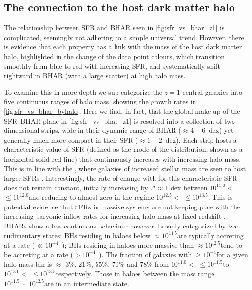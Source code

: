 \subsection{The connection to the host dark matter halo}
\label{sect:to_halo}

The relationship between SFR and BHAR seen in \cref{fig:sfr_vs_bhar_z1} is
complicated, seemingly not adhering to a simple universal trend.  However,
there is evidence that each property has a link with the mass of the host dark
matter halo, highlighted in the change of the data point colours, which
transition smoothly from blue to red with increasing SFR, and systematically
shift rightward in BHAR (with a large scatter) at high halo mass.    

To examine this in more depth we sub categorize the $z=1$ central galaxies into
five continuous ranges of halo mass, showing the growth rates in
\cref{fig:sfr_vs_bhar_byhalo}.  Here we find, in fact, that the global make up
of the SFR--BHAR plane in \cref{fig:sfr_vs_bhar_z1} is resolved into a
collection of two dimensional strips, wide in their dynamic range of BHAR
($\approx 4-6$~dex) yet generally much more compact in their SFR ($\approx
1-2$~dex).  Each strip hosts a characteristic value of SFR (defined as the mode
of the distribution, shown as a horizontal solid red line) that continuously
increases with increasing halo mass. This is in line with the , where galaxies of increased stellar mass are seen to
host larger SFRs \citep[e.g,][]{Elbaz2007}. Interestingly, the rate of change
with  for this characteristic SFR does not remain constant, initially
increasing by $\Delta$\SFR $\approx 1$ dex between $10^{11.0} <$  $ \leq
10^{12.0}$\Msol and reducing to almost zero in the regime $10^{12.5} < $
 $ \leq 10^{13.5}$\Msol. This is potential evidence that SFRs in massive
systems are not keeping pace with the increasing baryonic inflow rates for
increasing halo mass at fixed redshift \citep[e.g,][]{Correa2015}. BHARs show a
less continuous behaviour however, broadly categorized by two rudimentary
states: BHs residing in haloes below $\approx 10^{11.5}$\Msol are typically
accreting at a  rate (\BHAR $\ll 10^{-4}$~\Msolyr); BHs residing
in haloes more massive than $\approx 10^{12.5}$\Msol tend to be accreting at a
 rate (\BHAR $> 10^{-4}$~\Msolyr). The fraction of galaxies with
\BHAR $\geq 10^{-4}$\Msolyr for a given halo mass bin is $\approx$ 3\%, 21\%,
55\%, 70\% and 78\% from $10^{11.0} <$  $\leq 10^{11.5}$\Msol to
$10^{13.0} <$  $\leq 10^{13.5}$\Msol respectively.  Those in haloes
between the mass range $10^{11.5} \sim 10^{12.5}$\Msol are in an intermediate
state. 


